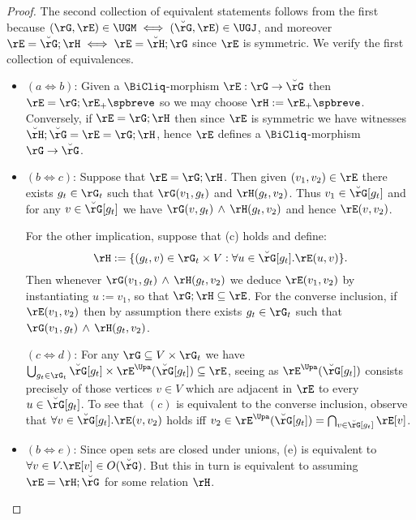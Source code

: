 \documentclass{article}
\begin{document}
\begin{proof}
The second collection of equivalent statements follows from the first because $(\rG,\rE) \in \UGM \iff (\breve{\rG},\rE) \in \UGJ$, and moreover $\rE = \breve{\rG};\rH \iff \rE = \breve{\rH};\rG$ since $\rE$ is symmetric. We verify the first collection of equivalences.
\begin{itemize}
\item
$(a \iff b)$: Given a $\BiCliq$-morphism $\rE : \rG \to \breve{\rG}$ then $\rE = \rG;\rE_+\spbreve$ so we may choose $\rH := \rE_+\spbreve$. Conversely, if $\rE = \rG ; \rH$ then since $\rE$ is symmetric we have witnesses $\breve{\rH};\breve{\rG} = \rE = \rG;\rH$, hence $\rE$ defines a $\BiCliq$-morphism $\rG \to \breve{\rG}$.

\item
$(b \iff c)$: Suppose that $\rE = \rG ; \rH$. Then given $(v_1,v_2) \in \rE$ there exists $g_t \in \rG_t$ such that $\rG(v_1,g_t)$ and $\rH(g_t,v_2)$. Thus $v_1 \in \breve{\rG}[g_t]$ and for any $v \in \breve{\rG}[g_t]$ we have $\rG(v,g_t) \, \land \, \rH(g_t,v_2)$ and hence $\rE(v,v_2)$.

For the other implication, suppose that (c) holds and define:
\[
\rH := \{ (g_t,v) \in \rG_t \times V : \forall u \in \breve{\rG}[g_t].\rE(u,v)  \}.
\]
Then whenever $\rG(v_1,g_t) \, \land \, \rH(g_t,v_2)$ we deduce $\rE(v_1,v_2)$ by instantiating $u := v_1$, so that $\rG ; \rH \subseteq \rE$. For the converse inclusion, if $\rE(v_1,v_2)$ then by assumption there exists $g_t \in \rG_t$ such that $\rG(v_1,g_t) \, \land \, \rH(g_t,v_2)$.

$(c \iff d)$: For any $\rG \subseteq V \times \rG_t$ we have $\bigcup_{g_t \in \rG_t} \breve{\rG}[g_t] \times \rE^\Upa(\breve{\rG}[g_t]) \subseteq \rE$, seeing as $\rE^\Upa(\breve{\rG}[g_t])$ consists precisely of those vertices $v \in V$ which are adjacent in $\rE$ to every $u \in \breve{\rG}[g_t]$. To see that $(c)$ is equivalent to the converse inclusion, observe that $\forall v \in \breve{\rG}[g_t].\rE(v,v_2)$ holds iff $v_2 \in \rE^\Upa(\breve{\rG}[g_t]) = \bigcap_{v \in \breve{\rG}[g_t]} \rE[v]$.

\item
$(b \iff e)$: Since open sets are closed under unions, (e) is equivalent to $\forall v \in V.\rE[v] \in O(\breve{\rG})$. But this in turn is equivalent to assuming $\rE = \rH ; \breve{\rG}$ for some relation $\rH$.

\end{itemize}
\end{proof}
\end{document}
